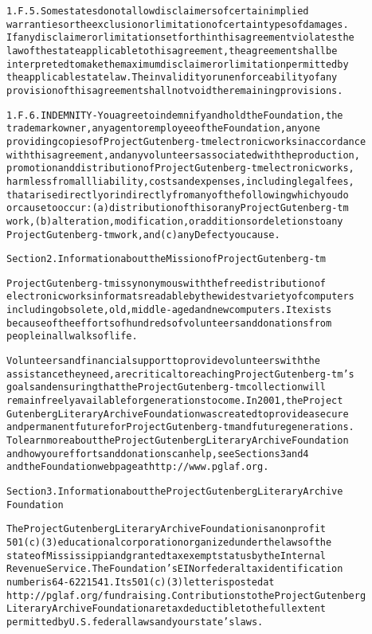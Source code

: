 \documentclass[12pt,leqno]{book}[2005/09/16]
\newenvironment{PGtext}{%
\begin{alltt}
\fontsize{9.2}{10.5}\ttfamily\selectfont}%
{\end{alltt}}
\begin{document}
\begin{PGtext}
1.F.5.  Some states do not allow disclaimers of certain implied
warranties or the exclusion or limitation of certain types of damages.
If any disclaimer or limitation set forth in this agreement violates the
law of the state applicable to this agreement, the agreement shall be
interpreted to make the maximum disclaimer or limitation permitted by
the applicable state law.  The invalidity or unenforceability of any
provision of this agreement shall not void the remaining provisions.

1.F.6.  INDEMNITY - You agree to indemnify and hold the Foundation, the
trademark owner, any agent or employee of the Foundation, anyone
providing copies of Project Gutenberg-tm electronic works in accordance
with this agreement, and any volunteers associated with the production,
promotion and distribution of Project Gutenberg-tm electronic works,
harmless from all liability, costs and expenses, including legal fees,
that arise directly or indirectly from any of the following which you do
or cause to occur: (a) distribution of this or any Project Gutenberg-tm
work, (b) alteration, modification, or additions or deletions to any
Project Gutenberg-tm work, and (c) any Defect you cause.


Section  2.  Information about the Mission of Project Gutenberg-tm

Project Gutenberg-tm is synonymous with the free distribution of
electronic works in formats readable by the widest variety of computers
including obsolete, old, middle-aged and new computers.  It exists
because of the efforts of hundreds of volunteers and donations from
people in all walks of life.

Volunteers and financial support to provide volunteers with the
assistance they need, are critical to reaching Project Gutenberg-tm's
goals and ensuring that the Project Gutenberg-tm collection will
remain freely available for generations to come.  In 2001, the Project
Gutenberg Literary Archive Foundation was created to provide a secure
and permanent future for Project Gutenberg-tm and future generations.
To learn more about the Project Gutenberg Literary Archive Foundation
and how your efforts and donations can help, see Sections 3 and 4
and the Foundation web page at http://www.pglaf.org.


Section 3.  Information about the Project Gutenberg Literary Archive
Foundation

The Project Gutenberg Literary Archive Foundation is a non profit
501(c)(3) educational corporation organized under the laws of the
state of Mississippi and granted tax exempt status by the Internal
Revenue Service.  The Foundation's EIN or federal tax identification
number is 64-6221541.  Its 501(c)(3) letter is posted at
http://pglaf.org/fundraising.  Contributions to the Project Gutenberg
Literary Archive Foundation are tax deductible to the full extent
permitted by U.S. federal laws and your state's laws.


\end{PGtext}
\end{document}
